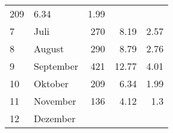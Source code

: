 \begin{longtable}{lXrrr}
       \num{209} &
       \num[round-mode=places,round-precision=2]{6.34} &
         \num[round-mode=places,round-precision=2]{1.99} \\

     7 &
     \multicolumn{1}{X}{ Juli   } &


       \num{270} &
       \num[round-mode=places,round-precision=2]{8.19} &
         \num[round-mode=places,round-precision=2]{2.57} \\

     8 &
     \multicolumn{1}{X}{ August   } &


       \num{290} &
       \num[round-mode=places,round-precision=2]{8.79} &
         \num[round-mode=places,round-precision=2]{2.76} \\

     9 &
     \multicolumn{1}{X}{ September   } &


       \num{421} &
       \num[round-mode=places,round-precision=2]{12.77} &
         \num[round-mode=places,round-precision=2]{4.01} \\

     10 &
     \multicolumn{1}{X}{ Oktober   } &


       \num{209} &
       \num[round-mode=places,round-precision=2]{6.34} &
         \num[round-mode=places,round-precision=2]{1.99} \\

     11 &
     \multicolumn{1}{X}{ November   } &


       \num{136} &
       \num[round-mode=places,round-precision=2]{4.12} &
         \num[round-mode=places,round-precision=2]{1.3} \\

     12 &
     \multicolumn{1}{X}{ Dezember   } &



\end{longtable}
